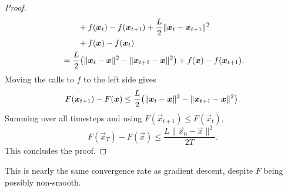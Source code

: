 \begin{proof}
\begin{align*}
                                      & \qquad + f(\vec{x}_t) - f(\vec{x}_{t+1}) + \frac{L}{2} \| \vec{x}_t - \vec{x}_{t+1} \|^2                                                                                                        \\
                                      & \qquad + f(\vec{x}) - f(\vec{x}_t)                                                                                                                                                              \\
                                      & = \frac{L}{2} \lft( \| \vec{x}_t - \vec{x} \|^2 - \| \vec{x}_{t+1} - \vec{x} \|^2 \rgt) + f(\vec{x}) - f(\vec{x}_{t+1}).
    \end{align*}
    Moving the calls to $f$ to the left side gives \[
        F(\vec{x}_{t+1}) - F(\vec{x}) \leq \frac{L}{2} \lft( \| \vec{x}_t - \vec{x} \|^2 - \| \vec{x}_{t+1} - \vec{x} \|^2 \rgt).
    \]
    Summing over all timesteps and using $F(\vec{x}_{t+1}) \leq F(\vec{x}_t)$, \[
        F(\vec{x}_T) - F(\vec{x}) \leq \frac{L \| \vec{x}_0 - \vec{x} \|^2}{2 T}.
    \]
    This concludes the proof.
\end{proof}

This is nearly the same convergence rate as gradient descent, despite $F$ being possibly
non-smooth.
